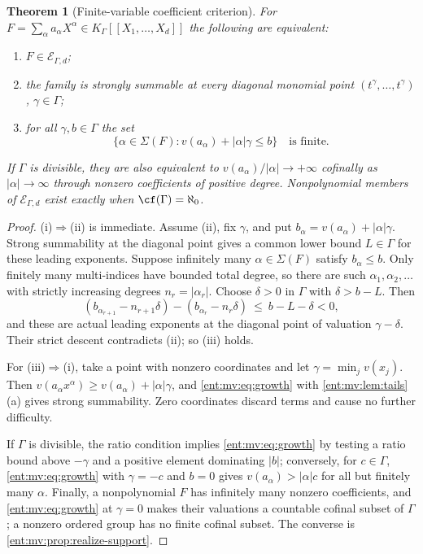 \documentclass[11pt]{article}
\newtheorem{theorem}{Theorem}[section]
\theoremstyle{plain}
\theoremstyle{plain}
\theoremstyle{plain}
\theoremstyle{definition}
\theoremstyle{definition}
\theoremstyle{definition}
\theoremstyle{definition}
\theoremstyle{remark}
\newcommand{\K}{K_\Gamma}\newcommand{\KD}{K_\Delta}
\begin{document}
\begin{theorem}[Finite-variable coefficient criterion]
\label{ent:thm:multi-criterion}
For $F=\sum_\alpha a_\alpha X^\alpha\in\K[[X_1,\ldots,X_d]]$ the following are
equivalent:
\begin{enumerate}[label=\textnormal{(\roman*)},leftmargin=2em]
\item $F\in\mathcal E_{\Gamma,d}$;
\item the family is strongly summable at every diagonal monomial point
$(t^\gamma,\ldots,t^\gamma)$, $\gamma\in\Gamma$;
\item for all $\gamma,b\in\Gamma$ the set
\begin{equation}\label{ent:mv:eq:growth}
 \{\alpha\in\Sigma(F):v(a_\alpha)+|\alpha|\gamma\le b\}
 \quad\text{is finite.}
\end{equation}
\end{enumerate}
If $\Gamma$ is divisible, they are also equivalent to
$v(a_\alpha)/|\alpha|\to+\infty$ cofinally as $|\alpha|\to\infty$ through
nonzero coefficients of positive degree. Nonpolynomial members of
$\mathcal E_{\Gamma,d}$ exist exactly when $\cf(\Gamma)=\aleph_0$.
\end{theorem}
\begin{proof}
(i)$\Rightarrow$(ii) is immediate. Assume (ii), fix $\gamma$, and put
$b_\alpha=v(a_\alpha)+|\alpha|\gamma$. Strong summability at the diagonal
point gives a common lower bound $L\in\Gamma$ for these leading exponents.
Suppose infinitely many $\alpha\in\Sigma(F)$ satisfy $b_\alpha\le b$. Only
finitely many multi-indices have bounded total degree, so there are such
$\alpha_1,\alpha_2,\ldots$ with strictly increasing degrees $n_r=|\alpha_r|$.
Choose $\delta>0$ in $\Gamma$ with $\delta>b-L$. Then
\[
 (b_{\alpha_{r+1}}-n_{r+1}\delta)-(b_{\alpha_r}-n_r\delta)\ \le\ b-L-\delta<0,
\]
and these are actual leading exponents at the diagonal point of valuation
$\gamma-\delta$. Their strict descent contradicts (ii); so (iii) holds.

For (iii)$\Rightarrow$(i), take a point with nonzero coordinates and let
$\gamma=\min_jv(x_j)$. Then $v(a_\alpha x^\alpha)\ge v(a_\alpha)+|\alpha|\gamma$,
and \eqref{ent:mv:eq:growth} with \cref{ent:mv:lem:tails}(a) gives strong
summability. Zero coordinates discard terms and cause no further difficulty.

If $\Gamma$ is divisible, the ratio condition implies \eqref{ent:mv:eq:growth}
by testing a ratio bound above $-\gamma$ and a positive element dominating
$|b|$; conversely, for $c\in\Gamma$, \eqref{ent:mv:eq:growth} with
$\gamma=-c$ and $b=0$ gives $v(a_\alpha)>|\alpha|c$ for all but finitely many
$\alpha$. Finally, a nonpolynomial $F$ has infinitely many nonzero
coefficients, and \eqref{ent:mv:eq:growth} at $\gamma=0$ makes their
valuations a countable cofinal subset of $\Gamma$; a nonzero ordered group
has no finite cofinal subset. The converse is
\cref{ent:mv:prop:realize-support}.
\end{proof}
\end{document}

